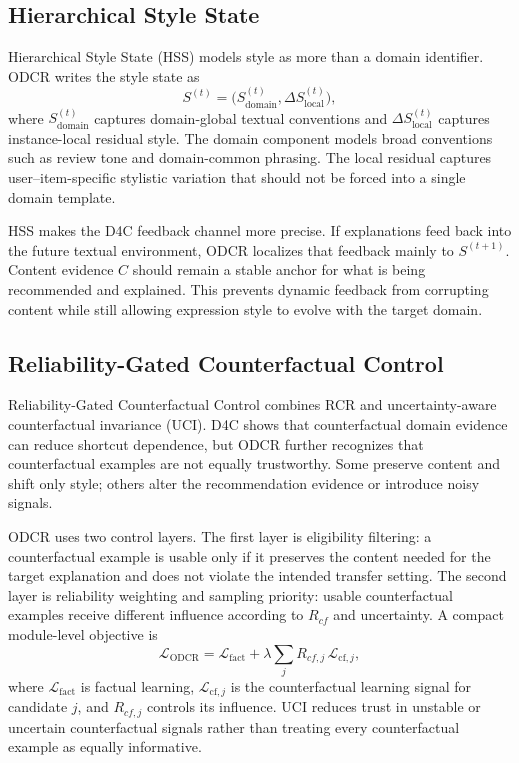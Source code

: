 \subsection{Hierarchical Style State}

Hierarchical Style State (HSS) models style as more than a domain identifier.
ODCR writes the style state as
\[
  S^{(t)} = \bigl(S_{\mathrm{domain}}^{(t)}, \Delta S_{\mathrm{local}}^{(t)}\bigr),
\]
where \(S_{\mathrm{domain}}^{(t)}\) captures domain-global textual conventions
and \(\Delta S_{\mathrm{local}}^{(t)}\) captures instance-local residual style.
The domain component models broad conventions such as review tone and
domain-common phrasing. The local residual captures user--item-specific
stylistic variation that should not be forced into a single domain template.

HSS makes the D4C feedback channel more precise. If explanations feed back
into the future textual environment, ODCR localizes that feedback mainly to
\(S^{(t+1)}\). Content evidence \(C\) should remain a stable anchor for what is
being recommended and explained. This prevents dynamic feedback from
corrupting content while still allowing expression style to evolve with the
target domain.

\subsection{Reliability-Gated Counterfactual Control}

Reliability-Gated Counterfactual Control combines RCR and uncertainty-aware
counterfactual invariance (UCI). D4C shows that counterfactual domain evidence
can reduce shortcut dependence, but ODCR further recognizes that
counterfactual examples are not equally trustworthy. Some preserve content and
shift only style; others alter the recommendation evidence or introduce noisy
signals.

ODCR uses two control layers. The first layer is eligibility filtering: a
counterfactual example is usable only if it preserves the content needed for
the target explanation and does not violate the intended transfer setting. The
second layer is reliability weighting and sampling priority: usable
counterfactual examples receive different influence according to \(R_{cf}\)
and uncertainty. A compact module-level objective is
\[
  \mathcal{L}_{\mathrm{ODCR}}
  =
  \mathcal{L}_{\mathrm{fact}}
  +
  \lambda \sum_j R_{cf,j}\,\mathcal{L}_{\mathrm{cf},j},
\]
where \(\mathcal{L}_{\mathrm{fact}}\) is factual learning, \(\mathcal{L}_{\mathrm{cf},j}\)
is the counterfactual learning signal for candidate \(j\), and \(R_{cf,j}\)
controls its influence. UCI reduces trust in unstable or uncertain
counterfactual signals rather than treating every counterfactual example as
equally informative.

